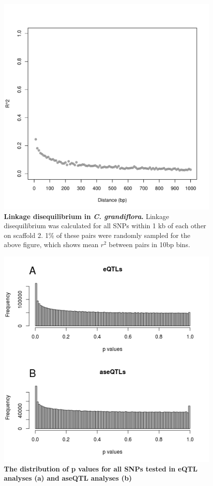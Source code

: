 \begin{figure}[ht]
      \centering
       \includegraphics[width=\linewidth]{Ch3FigS1}
    \caption{\textbf{Linkage disequilibrium in \textit{C. grandiflora}.} Linkage disequilibrium was calculated for all SNPs within 1 kb of each other on scaffold 2. 1\% of these pairs were randomly sampled for the above figure, which shows mean $r{^2}$ between pairs in 10bp bins.}
    \label{fig:3figS1}
\end{figure}

\begin{figure}[ht]
      \centering
       \includegraphics[width=\linewidth]{Ch3FigS2}
    \caption{\textbf{The distribution of p values for all SNPs tested in eQTL analyses (a) and aseQTL analyses (b)}}
    \label{fig:3figS2}
\end{figure}

